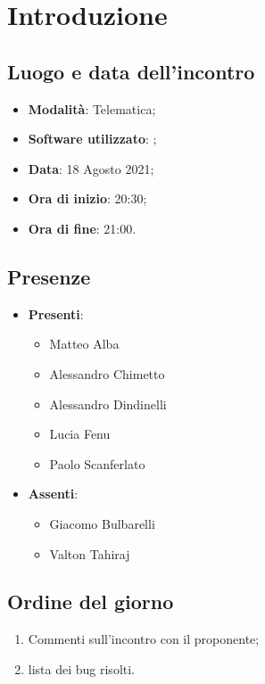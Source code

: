 \documentclass[]{article}
\begin{document}
	

	\newpage


		\section{Introduzione}
		\subsection{Luogo e data dell'incontro}
		\begin{itemize}
			\item \textbf{Modalità}: Telematica;
			\item \textbf{Software utilizzato}: ;
			\item \textbf{Data}: 18 Agosto 2021;
			\item \textbf{Ora di inizio}: 20:30;
			\item \textbf{Ora di fine}: 21:00.
		\end{itemize}

		\subsection{Presenze}
		\begin{itemize}
			\item \textbf{Presenti}:
			\begin{itemize}
				\item Matteo Alba
				\item Alessandro Chimetto
				\item Alessandro Dindinelli
				\item Lucia Fenu
				\item Paolo Scanferlato
				
			\end{itemize}
			\item \textbf{Assenti}:
			\begin{itemize}
					\item Giacomo Bulbarelli
					\item Valton Tahiraj
			\end{itemize}
		\end{itemize}


		\subsection{Ordine del giorno}
		\begin{enumerate}
			\item Commenti sull'incontro con il proponente;
			\item lista dei bug risolti.
           
		\end{enumerate}
\end{document}
